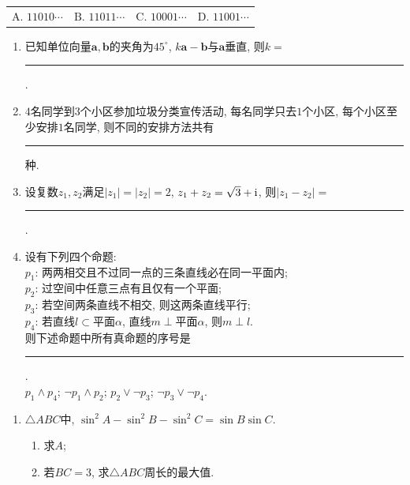 \begin{description}
\begin{enumerate}[leftmargin=5pt]
        {\centering\begin{tabular*}{\linewidth}{@{}@{\extracolsep{\fill}}llll@{}}
            \(\text{A. } 11010\cdots\)  & \(\text{B. } 11011\cdots\)  & \(\text{C. } 10001\cdots\)  & \(\text{D. } 11001\cdots\)
        \end{tabular*}\par}
        
    \end{enumerate}
    
    \item[二、填空题]
    \begin{enumerate}[leftmargin=5pt]
      \addtocounter{enumi}{+12}
        \item 已知单位向量$\bm{a},\bm{b}$的夹角为$45^{\circ}$, $k\bm{a}-\bm{b}$与$\bm{a}$垂直, 则$k=$ \rule[-0.3ex]{3em}{0.4pt}.
        \item $4$名同学到$3$个小区参加垃圾分类宣传活动, 每名同学只去$1$个小区, 每个小区至少安排$1$名同学, 则不同的安排方法共有 \rule[-0.3ex]{3em}{0.4pt} 种.
        \item 设复数$z_1,z_2$满足$|z_1|=|z_2|=2$, $z_1+z_2=\sqrt{3}+\mathrm{i}$, 则$|z_1-z_2|=$ \rule[-0.3ex]{3em}{0.4pt}.
        \item 设有下列四个命题:\\
        $p_1$: 两两相交且不过同一点的三条直线必在同一平面内;\\
        $p_2$: 过空间中任意三点有且仅有一个平面;\\
        $p_3$: 若空间两条直线不相交, 则这两条直线平行;\\
        $p_4$: 若直线$l\subset$平面$\alpha$, 直线$m\perp$平面$\alpha$, 则$m\perp l$.\\
        则下述命题中所有真命题的序号是 \rule[-0.3ex]{3em}{0.4pt}.\\
         $p_1\land p_4$; \quad {} $\neg p_1\land p_2$; \quad {} $p_2\lor\neg p_3$; \quad {} $\neg p_3\lor\neg p_4$.
    \end{enumerate}
    
    \item[三、解答题]
    \begin{enumerate}[leftmargin=5pt]
      \addtocounter{enumi}{+16}
        \item $\triangle ABC$中, $\sin^{2}A-\sin^{2}B-\sin^{2}C=\sin B\sin C$.
        \begin{enumerate}[label=(\arabic*)]
            \item 求$A$;
            \item 若$BC=3$, 求$\triangle ABC$周长的最大值.
        \end{enumerate}


\end{enumerate}
\end{description}
